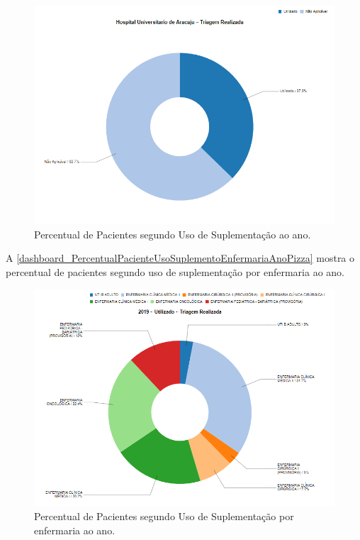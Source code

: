 \begin{figure}[htb]
	\caption{\label{dashboard_PercentualPacienteUsoSuplementoHospitalAnoPizza}Percentual de Pacientes segundo Uso de Suplementação ao ano.}
	\begin{center}
	    \includegraphics[scale=0.6]{Imagens/4.1.PercentualPacienteUsoSuplementoHospitalAnoPizza.png}
	\end{center}
\end{figure}

\newpage
A \autoref{dashboard_PercentualPacienteUsoSuplementoEnfermariaAnoPizza} mostra o percentual de pacientes segundo uso de suplementação por enfermaria ao ano.

\begin{figure}[htb]
	\caption{\label{dashboard_PercentualPacienteUsoSuplementoEnfermariaAnoPizza}Percentual de Pacientes segundo Uso de Suplementação por enfermaria ao ano.}
	\begin{center}
	    \includegraphics[scale=0.8]{Imagens/4.3.PercentualPacienteUsoSuplementoEnfermariaAnoPizza.png}
	\end{center}
\end{figure}

